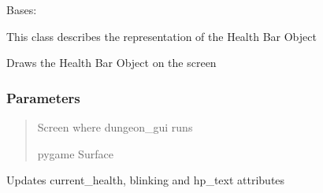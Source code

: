 \documentclass[letterpaper,10pt,english]{sphinxmanual}
\begin{document}
\begin{fulllineitems}
\label{\detokenize{api_reference/dungeon_gui/health_bar:health_bar.HealthBar}}
\pysigstartsignatures
{}
\pysigstopsignatures
\sphinxAtStartPar
Bases: 

\sphinxAtStartPar
This class describes the representation of the Health Bar Object

\begin{fulllineitems}
\label{\detokenize{api_reference/dungeon_gui/health_bar:health_bar.HealthBar.draw}}
\pysigstartsignatures
{}
\pysigstopsignatures
\sphinxAtStartPar
Draws the Health Bar Object on the screen


\subsubsection{Parameters}
\label{\detokenize{api_reference/dungeon_gui/health_bar:parameters}}\begin{quote}\begin{description}
\sphinxAtStartPar
Screen where dungeon\_gui runs

\sphinxAtStartPar
pygame Surface

\end{description}\end{quote}

\end{fulllineitems}


\begin{fulllineitems}
\label{\detokenize{api_reference/dungeon_gui/health_bar:health_bar.HealthBar.update_health}}
\pysigstartsignatures
{}
\pysigstopsignatures
\sphinxAtStartPar
Updates current\_health, blinking and hp\_text attributes



\end{fulllineitems}
\end{fulllineitems}
\end{document}

